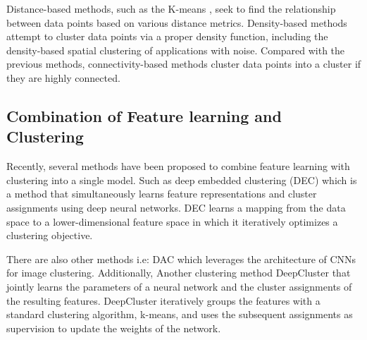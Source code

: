 Distance-based methods, such as the K-means \cite{jin2010k}, seek to find the relationship between data points based on various distance metrics. Density-based methods attempt to cluster data points via a proper density function, including the density-based spatial clustering of applications with noise.\cite{inbook} Compared with the previous methods, connectivity-based methods cluster data points into a cluster if they are highly connected. \cite{LEE2021107708}



\subsection{Combination of Feature learning and Clustering} 

Recently, several methods have been proposed to combine feature learning with clustering into a single model. Such as deep embedded clustering (DEC)\cite{xie2016unsupervised} which is a method that simultaneously learns feature representations and cluster assignments using deep neural networks. DEC learns a mapping from the data space to a lower-dimensional feature space in which it iteratively optimizes a clustering objective. 

\medskip

There are also other methods i.e: DAC \cite{chang2017deep} which leverages the architecture of CNNs for image clustering. Additionally, Another clustering method  DeepCluster  \cite{caron2018deep} that jointly learns the parameters of a neural network and the cluster assignments of the resulting features. DeepCluster iteratively groups the features with a standard clustering algorithm, k-means, and uses the subsequent assignments as supervision to update the weights of the network.



